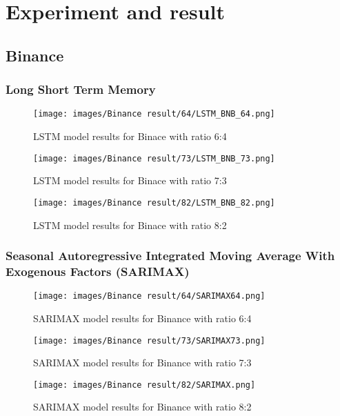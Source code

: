 \documentclass{ieeeojies}
\begin{document}
\section{Experiment and result}
\subsection{Binance}
\subsubsection{Long Short Term Memory}
\begin{figure}[H]
  \centering
    \texttt{[image: images/Binance result/64/LSTM\_BNB\_64.png]}\\
  \caption{LSTM model results for Binace with ratio 6:4}
  \label{fig:lstm_bn_64}
\end{figure}

\begin{figure}[H]
  \centering
    \texttt{[image: images/Binance result/73/LSTM\_BNB\_73.png]}\\
  \caption{LSTM model results for Binace with ratio 7:3}
  \label{fig:lstm_bn_73}
\end{figure}
    
\begin{figure}[H]
  \centering
    \texttt{[image: images/Binance result/82/LSTM\_BNB\_82.png]}
  \caption{LSTM model results for Binace with ratio 8:2}
  \label{fig:lstm_bn_82}
\end{figure}
    

\subsubsection{Seasonal Autoregressive Integrated
Moving Average With Exogenous Factors
(SARIMAX)}
\begin{figure}[H]
  \centering
\texttt{[image: images/Binance result/64/SARIMAX64.png]}
  \caption{SARIMAX model results for Binance with ratio 6:4}
  \label{fig:sarimax_bn_64}
\end{figure}

\begin{figure}[H]
  \centering
\texttt{[image: images/Binance result/73/SARIMAX73.png]}
  \caption{SARIMAX model results for Binance with ratio 7:3}
  \label{fig:sarimax_bn_73}
\end{figure}

\begin{figure}[H]
  \centering
\texttt{[image: images/Binance result/82/SARIMAX.png]}
  \caption{SARIMAX model results for Binance with ratio 8:2}
  \label{fig:sarimax_bn_82}
\end{figure}
\end{document}
